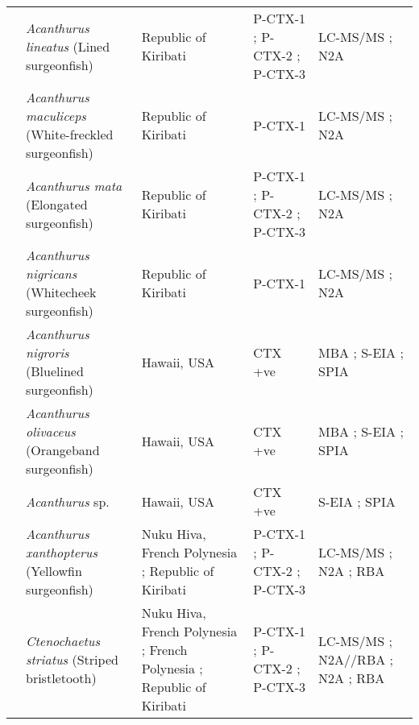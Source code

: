 \documentclass[12pt]{article}
\begin{document}
\begin{longtable}[l]{ | p{2cm} | p{3cm} | p{4.5cm} | p{2cm} | p{3cm} | }
	& \emph{Acanthurus lineatus} (Lined surgeonfish) & Republic of Kiribati \cite{mak2013pacific} & P-CTX-1 \cite{mak2013pacific}; P-CTX-2 \cite{mak2013pacific}; P-CTX-3 \cite{mak2013pacific} & LC-MS/MS \cite{mak2013pacific}; N2A \cite{mak2013pacific} \\
	& \emph{Acanthurus maculiceps} (White-freckled surgeonfish) & Republic of Kiribati \cite{mak2013pacific} & P-CTX-1 \cite{mak2013pacific} & LC-MS/MS \cite{mak2013pacific}; N2A \cite{mak2013pacific} \\
		&  \emph{Acanthurus mata} (Elongated surgeonfish) & Republic of Kiribati \cite{mak2013pacific} & P-CTX-1 \cite{mak2013pacific}; P-CTX-2 \cite{mak2013pacific}; P-CTX-3 \cite{mak2013pacific} & LC-MS/MS \cite{mak2013pacific}; N2A \cite{mak2013pacific} \\
	& \emph{Acanthurus nigricans} (Whitecheek surgeonfish) & Republic of Kiribati \cite{mak2013pacific} & P-CTX-1 \cite{mak2013pacific}& LC-MS/MS \cite{mak2013pacific}; N2A \cite{mak2013pacific} \\
	& \emph{Acanthurus nigroris} (Bluelined surgeonfish) & Hawaii, USA \cite{hokama1993evaluation} & CTX +ve \cite{hokama1993evaluation} & MBA \cite{hokama1993evaluation}; S-EIA \cite{hokama1993evaluation}; SPIA \cite{hokama1993evaluation} \\
	& \emph{Acanthurus olivaceus} (Orangeband surgeonfish) & Hawaii, USA \cite{hokama1993evaluation} & CTX +ve \cite{hokama1993evaluation} & MBA \cite{hokama1993evaluation}; S-EIA \cite{hokama1993evaluation}; SPIA \cite{hokama1993evaluation} \\
	& \emph{Acanthurus }sp. & Hawaii, USA \cite{hokama1990simplified} & CTX +ve \cite{hokama1990simplified} & S-EIA \cite{hokama1990simplified}; SPIA \cite{hokama1990simplified} \\
	& \emph{Acanthurus xanthopterus} (Yellowfin surgeonfish) & Nuku Hiva, French Polynesia \cite{darius2007ciguatera}; Republic of Kiribati \cite{mak2013pacific} &  P-CTX-1 \cite{mak2013pacific}; P-CTX-2 \cite{mak2013pacific}; P-CTX-3 \cite{mak2013pacific} & LC-MS/MS \cite{mak2013pacific}; N2A \cite{mak2013pacific}; RBA \cite{darius2007ciguatera}\\
	& \emph{Ctenochaetus striatus} (Striped bristletooth) & Nuku Hiva, French Polynesia \cite{darius2007ciguatera}; French Polynesia \cite{chinain2014mail}; Republic of Kiribati \cite{mak2013pacific} & P-CTX-1 \cite{mak2013pacific}; P-CTX-2 \cite{mak2013pacific}; P-CTX-3 \cite{mak2013pacific} & LC-MS/MS \cite{mak2013pacific}; N2A//RBA \cite{chinain2014mail}; N2A \cite{mak2013pacific}; RBA \cite{darius2007ciguatera} \\
	\hline
	\end{longtable}
	\FloatBarrier
	
\end{document}
